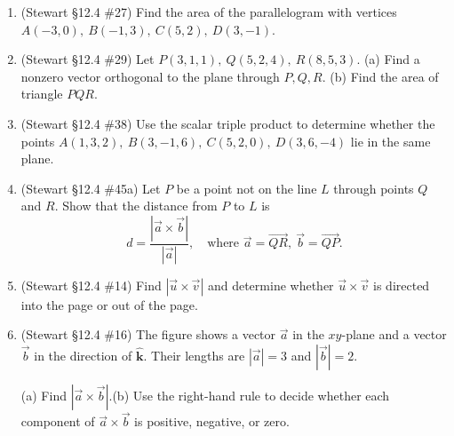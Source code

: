 \documentclass[12pt]{article}
\newcommand{\khat}{\hat{\textbf{k}}}
\begin{document}
\begin{enumerate}
\begin{enumerate}
\begin{enumerate}
        \end{enumerate}
        \item (Stewart \S12.4 \#27) Find the area of the parallelogram with vertices $A(-3,0),\ B(-1,3),\ C(5,2),\ D(3,-1)$.
        \item (Stewart \S12.4 \#29) Let $P(3,1,1),\ Q(5,2,4),\ R(8,5,3)$. (a) Find a nonzero vector orthogonal to the plane through $P,Q,R$. (b) Find the area of triangle $PQR$.
        \item (Stewart \S12.4 \#38) Use the scalar triple product to determine whether the points $A(1,3,2),\ B(3,-1,6),\ C(5,2,0),\ D(3,6,-4)$ lie in the same plane.
        \item (Stewart \S12.4 \#45a) Let $P$ be a point not on the line $L$ through points $Q$ and $R$. Show that the distance from $P$ to $L$ is
        \[ d = \frac{|\vec{a}\times\vec{b}|}{|\vec{a}|}, \quad \text{where } \vec{a}=\overrightarrow{QR},\ \vec{b}=\overrightarrow{QP}. \]

        \item (Stewart \S12.4 \#14) Find $|\vec{u}\times\vec{v}|$ and determine whether $\vec{u}\times\vec{v}$ is directed into the page or out of the page.
        \begin{center}
        \end{center}

        \item (Stewart \S12.4 \#16) The figure shows a vector $\vec{a}$ in the $xy$-plane and a vector $\vec{b}$ in the direction of $\khat$. Their lengths are $|\vec{a}|=3$ and $|\vec{b}|=2$.
        \begin{center}
        \end{center}
        (a) Find $|\vec{a}\times\vec{b}|$.\quad (b) Use the right-hand rule to decide whether each component of $\vec{a}\times\vec b$ is positive, negative, or zero.


\end{enumerate}
\end{enumerate}
\end{document}
